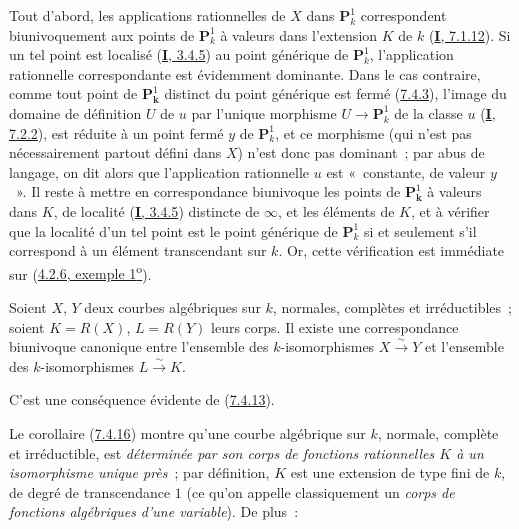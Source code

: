Tout d'abord, les applications rationnelles de $X$ dans $\mathbf{P}_k^1$
correspondent biunivoquement aux points de $\mathbf{P}_k^1$ à valeurs dans
l'extension $K$ de $k$ (\hyperref[I.7.1.12-fr]{\textbf{I}, 7.1.12}). Si un tel point
est localisé (\hyperref[I.3.4.5-fr]{\textbf{I}, 3.4.5}) au point générique de
$\mathbf{P}_k^1$, l'application rationnelle correspondante est évidemment
dominante. Dans le cas contraire, comme tout point de $\mathbf{P}_{\boldsymbol{k}}^1$
distinct du point générique est fermé (\hyperref[II.7.4.3-fr]{7.4.3}),
l'image du domaine de définition $U$ de $u$ par l'unique morphisme
$U\to\mathbf{P}_k^1$ de la classe $u$ (\hyperref[I.7.2.2-fr]{\textbf{I}, 7.2.2}),
est réduite à un point fermé $y$ de $\mathbf{P}_k^1$, et ce morphisme (qui
n'est pas nécessairement partout défini dans $X$) n'est donc pas dominant~;
par abus de langage, on dit alors que l'application rationnelle $u$ est
«~constante, de valeur $y$~». Il reste à mettre en correspondance biunivoque
les points de $\mathbf{P}_{\boldsymbol{k}}^1$ à valeurs dans $K$, de localité
(\hyperref[I.3.4.5-fr]{\textbf{I}, 3.4.5}) distincte de $\infty$, et les éléments de
$K$, et à vérifier que la localité d'un tel point est le point générique de
$\mathbf{P}_k^1$ si et seulement s'il correspond à un
élément transcendant sur $k$. Or, cette vérification est immédiate sur
(\hyperref[II.4.2.6-fr]{4.2.6, exemple 1\textsuperscript{o}}).

\begin{corollary}[7.4.16]
\label{II.7.4.16-fr}
Soient $X$, $Y$ deux courbes algébriques sur $k$, \textup{normales, complètes} et
irréductibles~; soient $K=R(X)$, $L=R(Y)$ leurs corps. Il existe une
correspondance biunivoque canonique entre l'ensemble des $k$-isomorphismes
$X\xrightarrow{\sim}Y$ et l'ensemble des $k$-isomorphismes
$L\xrightarrow{\sim}K$.
\end{corollary}

C'est une conséquence évidente de (\hyperref[II.7.4.13-fr]{7.4.13}).

\begin{env}[7.4.17]
\label{II.7.4.17-fr}
Le corollaire (\hyperref[II.7.4.16-fr]{7.4.16}) montre qu'une courbe algébrique
sur $k$, normale, complète et irréductible, est \emph{déterminée par son corps
de fonctions rationnelles $K$ à un isomorphisme unique près}~; par définition,
$K$ est une extension de type fini de $k$, de degré de transcendance $1$ (ce
qu'on appelle classiquement un \emph{corps de fonctions algébriques d'une
variable}). De plus~:
\end{env}

